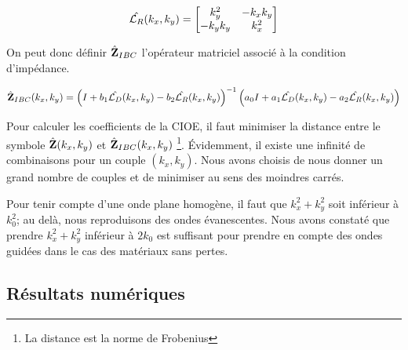     \begin{equation}
      \hat{{\mathcal{L}_R}}(k_x,k_y) = 
      \begin{bmatrix}
        k_y^2 & -k_x k_y 
        \\
        -k_y k_y & k_x^2
      \end{bmatrix}
    \end{equation}

    On peut donc définir \(\hat{\mathbf{Z}}_{IBC}\) l’opérateur matriciel associé à la condition d'impédance. 

    \begin{align}
        \hat{\mathbf{Z}}_{IBC}(k_x,k_y) = \left(I + b_1 \hat{{\mathcal{L}_D}}(k_x,k_y) - b_2 \hat{{\mathcal{L}_R}}(k_x,k_y) \right)^{-1} \left(a_0 I + a_1 \hat{{\mathcal{L}_D}}(k_x,k_y) - a_2 \hat{{\mathcal{L}_R}}(k_x,k_y)\right)
    \end{align}

    Pour calculer les coefficients de la CIOE, il faut minimiser la distance entre le symbole \(\hat{\mathbf{Z}}(k_x,k_y)\) et \(\hat{\mathbf{Z}}_{IBC}(k_x,k_y)\) \footnote{La distance est la norme de Frobenius}. Évidemment, il existe une infinité de combinaisons pour un couple \((k_x,k_y)\). Nous avons choisis de nous donner un grand nombre de couples et de minimiser au sens des moindres carrés.

    Pour tenir compte d'une onde plane homogène, il faut que \(k_x^2 + k_y^2\) soit inférieur à \(k_0^2\); au delà, nous reproduisons des ondes évanescentes. Nous avons constaté que prendre \(k_x^2 + k_y^2\) inférieur à \(2k_0\) est suffisant pour prendre en compte des ondes guidées dans le cas des matériaux sans pertes.

  \subsection{Résultats numériques}